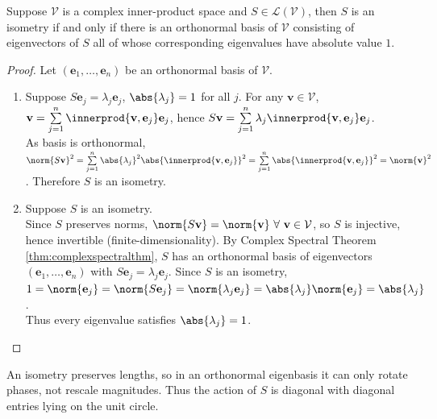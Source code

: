 \begin{theorem} Suppose $\mathcal{V}$ is a complex inner-product space and $S \in \mathcal{L}(\mathcal{V})$, then $S$ is an isometry if and only if there is an orthonormal basis of $\mathcal{V}$ consisting of eigenvectors of $S$ all of whose corresponding eigenvalues have absolute value $1$.
\begin{proof} 
Let $(\mathbf{e}_1, \ldots, \mathbf{e}_n)$ be an orthonormal basis of $\mathcal{V}$.
\begin{enumerate}[label=\roman*.]
\setlength{\itemsep}{0pt}
\item[$(\Leftarrow)$] Suppose $S \mathbf{e}_j = \lambda_j \mathbf{e}_j$, $\abs{\lambda_j} = 1$ for all $j$. For any $\mathbf{v} \in \mathcal{V}$, $\mathbf{v} = \sum\limits_{j=1}^n \innerprod{\mathbf{v}, \mathbf{e}_j} \mathbf{e}_j$, hence $S \mathbf{v} = \sum\limits_{j=1}^n \lambda_j \innerprod{\mathbf{v}, \mathbf{e}_j} \mathbf{e}_j$.\\
As basis is orthonormal, $\norm{S \mathbf{v}}^2 = \sum\limits_{j=1}^n \abs{\lambda_j}^2 \abs{\innerprod{\mathbf{v}, \mathbf{e}_j}}^2 = \sum\limits_{j=1}^n \abs{\innerprod{\mathbf{v}, \mathbf{e}_j}}^2 = \norm{\mathbf{v}}^2$. Therefore $S$ is an isometry.
\item[$(\Rightarrow)$] Suppose $S$ is an isometry.\\
Since $S$ preserves norms, $\norm{S \mathbf{v}} = \norm{\mathbf{v}} \ \forall \ \mathbf{v} \in \mathcal{V}$, so $S$ is injective, hence invertible (finite-dimensionality). By Complex Spectral Theorem \ref{thm:complexspectralthm}, $S$ has an orthonormal basis of eigenvectors $(\mathbf{e}_1, \ldots, \mathbf{e}_n)$ with $S \mathbf{e}_j = \lambda_j \mathbf{e}_j$. Since $S$ is an isometry, $1 = \norm{\mathbf{e}_j} = \norm{S \mathbf{e}_j} = \norm{\lambda_j \mathbf{e}_j} = \abs{\lambda_j} \norm{\mathbf{e}_j} = \abs{\lambda_j}$.\\
Thus every eigenvalue satisfies $\abs{\lambda_j} = 1$.
\end{enumerate}
\end{proof}
\end{theorem}

An isometry preserves lengths, so in an orthonormal eigenbasis it can only rotate phases, not rescale magnitudes. Thus the action of $S$ is diagonal with diagonal entries lying on the unit circle.

